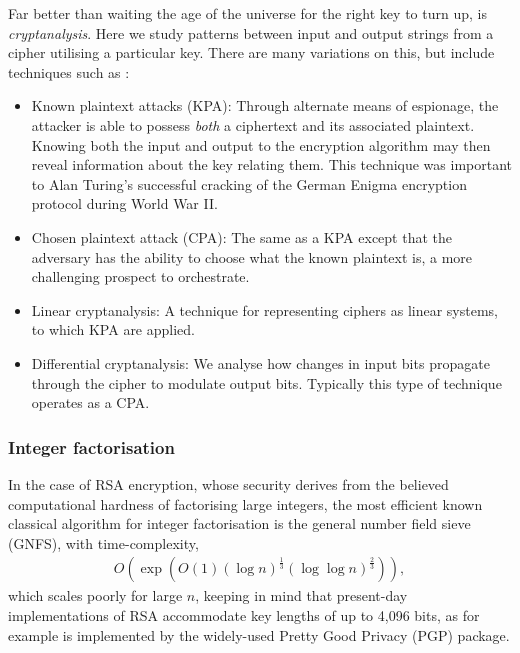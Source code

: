 Far better than waiting the age of the universe for the right key to turn up, is \textit{cryptanalysis}. Here we study patterns between input and output strings from a cipher utilising a particular key. There are many variations on this, but include techniques such as \cite{bib:Schneier96}:

\begin{itemize}
	\item Known plaintext attacks (KPA): Through alternate means of espionage, the attacker is able to possess \textit{both} a ciphertext and its associated plaintext. Knowing both the input and output to the encryption algorithm may then reveal information about the key relating them. This technique was important to Alan Turing's successful cracking of the German Enigma encryption protocol during World War II.
	\item Chosen plaintext attack (CPA): The same as a KPA except that the adversary has the ability to choose what the known plaintext is, a more challenging prospect to orchestrate.
	\item Linear cryptanalysis: A technique for representing ciphers as linear systems, to which KPA are applied.
	\item Differential cryptanalysis: We analyse how changes in input bits propagate through the cipher to modulate output bits. Typically this type of technique operates as a CPA.
\end{itemize}
 
%
%
 
\subsubsection{Integer factorisation}

In the case of RSA encryption, whose security derives from the believed computational hardness of factorising large integers, the most efficient known classical algorithm for integer factorisation is the general number field sieve (GNFS), with time-complexity,
\begin{align} \label{eq:GNFS_scaling}
	O(\exp (O(1) (\log n)^{\frac{1}{3}} (\log\log n)^{\frac{2}{3}})),
\end{align}
which scales poorly for large $n$, keeping in mind that present-day implementations of RSA accommodate key lengths of up to 4,096 bits, as for example is implemented by the widely-used Pretty Good Privacy (PGP) package.

